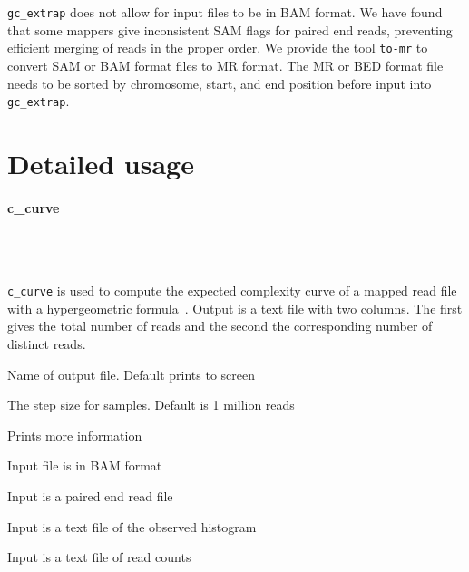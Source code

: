 \documentclass[11pt, titlepage]{article}
\newcommand{\fn}[1]{\texttt{#1}}
\begin{document}
\fn{gc\_extrap} does not allow for input files to be in BAM format.
We have found that some mappers give inconsistent SAM flags
for paired end reads, preventing efficient merging of reads in
the proper order.
We provide the tool \fn{to-mr}
to convert SAM or BAM format files to MR format.  The MR
or BED format file needs to be sorted by chromosome, start, and
end position before input into \fn{gc\_extrap}.


\newpage

\section{Detailed usage}
\label{chap:detail}

\paragraph{c\_curve}~\\~\\[-.2cm]
\label{sec:complexityplot}

\fn{c\_curve} is used to compute the
expected complexity curve of a mapped read file
with a hypergeometric formula~\cite{heck1975explicit}.
Output is a text file with two
columns.  The first gives the total number
of reads and the second the corresponding number
of distinct reads.

\begin{description}[style=multiline,leftmargin=6cm,font=\ttfamily]
\item[\begingroup \fontsize{9pt}{12pt}\selectfont-o, -output\endgroup] Name of output file. Default prints to screen
\item[\begingroup \fontsize{9pt}{12pt}\selectfont-s, -step\endgroup] The step size for samples. Default is 1 million reads
\item[\begingroup \fontsize{9pt}{12pt}\selectfont-v -verbose\endgroup] Prints more information
\item[\begingroup \fontsize{9pt}{12pt}\selectfont-B, -bam\endgroup] Input file is in BAM format
\item[\begingroup \fontsize{9pt}{12pt}\selectfont-P, -pe\endgroup] Input is a paired end read file
\item[\begingroup \fontsize{9pt}{12pt}\selectfont-H, -hist\endgroup] Input is a text file of the observed histogram
\item[\begingroup \fontsize{9pt}{12pt}\selectfont-V, -vals\endgroup] Input is a text file of read counts
\end{description}
\end{document}
